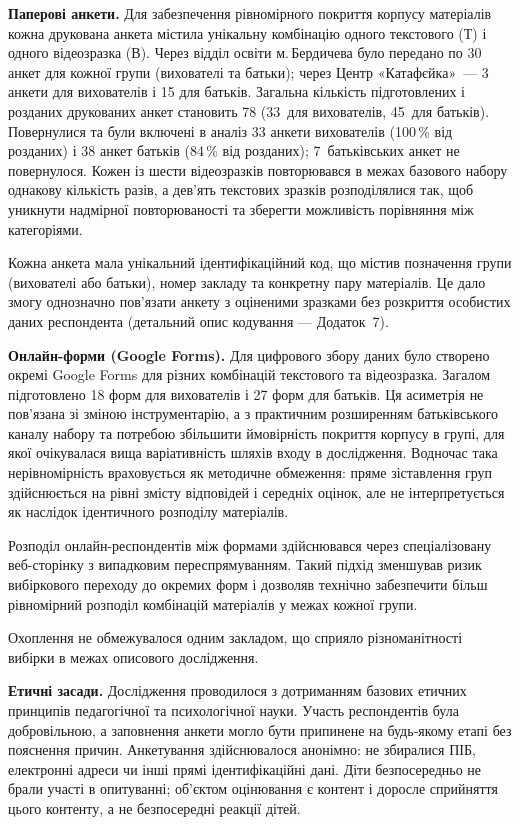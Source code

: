 \documentclass[14pt, a4paper]{extreport}
\begin{document}
\textbf{Паперові анкети.} Для забезпечення рівномірного покриття корпусу матеріалів кожна друкована анкета містила унікальну комбінацію одного текстового (Т) і одного відеозразка (В). Через відділ освіти м.\,Бердичева було передано по 30 анкет для кожної групи (вихователі та батьки); через Центр «Катафєйка»~--- 3 анкети для вихователів і 15 для батьків. Загальна кількість підготовлених і розданих друкованих анкет становить 78 (33~для вихователів, 45~для батьків). Повернулися та були включені в аналіз 33 анкети вихователів (100\,\% від розданих) і 38 анкет батьків (84\,\% від розданих); 7~батьківських анкет не повернулося. Кожен із шести відеозразків повторювався в межах базового набору однакову кількість разів, а дев'ять текстових зразків розподілялися так, щоб уникнути надмірної повторюваності та зберегти можливість порівняння між категоріями.

Кожна анкета мала унікальний ідентифікаційний код, що містив позначення групи (вихователі або батьки), номер закладу та конкретну пару матеріалів. Це дало змогу однозначно пов'язати анкету з оціненими зразками без розкриття особистих даних респондента (детальний опис кодування --- Додаток~7).

\textbf{Онлайн-форми (Google Forms).} Для цифрового збору даних було створено окремі Google Forms для різних комбінацій текстового та відеозразка. Загалом підготовлено 18 форм для вихователів і 27 форм для батьків. Ця асиметрія не пов'язана зі зміною інструментарію, а з практичним розширенням батьківського каналу набору та потребою збільшити ймовірність покриття корпусу в групі, для якої очікувалася вища варіативність шляхів входу в дослідження. Водночас така нерівномірність враховується як методичне обмеження: пряме зіставлення груп здійснюється на рівні змісту відповідей і середніх оцінок, але не інтерпретується як наслідок ідентичного розподілу матеріалів.

Розподіл онлайн-респондентів між формами здійснювався через спеціалізовану веб-сторінку з випадковим переспрямуванням. Такий підхід зменшував ризик вибіркового переходу до окремих форм і дозволяв технічно забезпечити більш рівномірний розподіл комбінацій матеріалів у межах кожної групи.

Охоплення не обмежувалося одним закладом, що сприяло різноманітності вибірки в межах описового дослідження.

\textbf{Етичні засади.}
Дослідження проводилося з дотриманням базових етичних принципів педагогічної та психологічної науки. Участь респондентів була добровільною, а заповнення анкети могло бути припинене на будь-якому етапі без пояснення причин. Анкетування здійснювалося анонімно: не збиралися ПІБ, електронні адреси чи інші прямі ідентифікаційні дані. Діти безпосередньо не брали участі в опитуванні; об'єктом оцінювання є контент і доросле сприйняття цього контенту, а не безпосередні реакції дітей.
\end{document}
